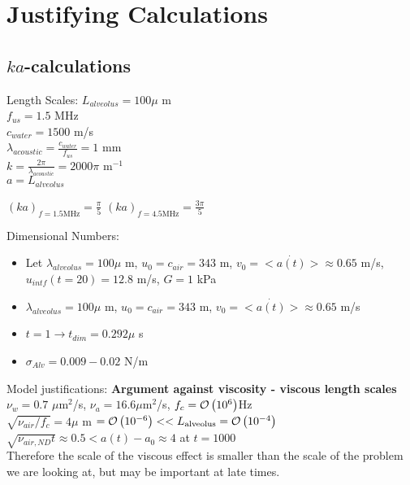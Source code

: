 \section{Justifying Calculations}
\subsection{$ka$-calculations}
Length Scales:
$L_{alveolus} = 100 \mu$ m\\
$f_{us} = 1.5$ MHz\\
$c_{water} = 1500$ m/s\\
$\lambda_{acoustic} = \frac{c_{water}}{f_{us}} = 1$ mm\\
$k = \frac{2\pi}{\lambda_{acoustic}} = 2000 \pi$ m$^{-1}$\\
$a = L_{alveolus}$

$(ka)_{f=1.5 \text{MHz}} = \frac{\pi}{5}$
$(ka)_{f=4.5 \text{MHz}} = \frac{3\pi}{5}$



Dimensional Numbers:\\
\begin{itemize}
\item Let $\lambda_{alveolus}=100 \mu$ m, $u_0=c_{air}=343$ m, $v_0=<\dot{a(t)}>\approx0.65$ m/s, $u_{intf}(t=20)=12.8$ m/s, $G=1$ kPa %
\item $\lambda_{alveolus}=100 \mu$ m, $u_0=c_{air}=343$ m, $v_0=<\dot{a(t)}>\approx0.65$ m/s
\item $t=1 \rightarrow t_{dim}=0.292 \mu$ s
\item $\sigma_{Alv} = 0.009 - 0.02$ N/m \cite{Schurch1976}
\end{itemize}



Model justifications:
\textbf{Argument against viscosity - viscous length scales}\\
$\nu_{w}=0.7$ $\mu$m$^2$/s,\qquad
$\nu_{a}=16.6 \mu$m$^2$/s,\qquad
$f_c=\mathcal{O}\left(10^6\right)$Hz\\
$\sqrt{\nu_{air}/f_c}=4\mu$ m $=\mathcal{O}\left(10^{-6}\right) << L_{\text{alveolus}}=\mathcal{O}\left(10^{-4}\right)$\\ \vspace*{4pt}
$\sqrt{\nu_{air,ND}t} \approx0.5 < a(t)-a_0\approx4$ at $t=1000$\\ \vspace*{4pt}  
Therefore the scale of the viscous effect is smaller than the scale of the problem we are looking at, but may be important at late times.\\


